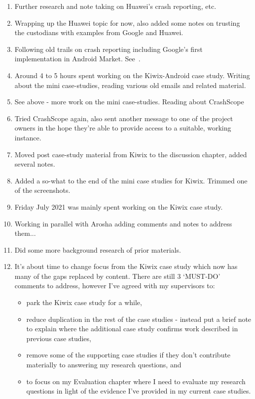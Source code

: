 \begin{enumerate}
    \item Further research and note taking on Huawei's crash reporting, etc.
    \item Wrapping up the Huawei topic for now, also added some notes on trusting the custodians with examples from Google and Huawei.
    \item Following old trails on crash reporting including Google's first implementation in Android Market. See~\href{app:crash-recording-and-reporting-in-android}{}.
    \item Around 4 to 5 hours spent working on the Kiwix-Android case study. Writing about the mini case-studies, reading various old emails and related material.
    \item See above - more work on the mini case-studies. Reading about CrashScope
    \item Tried CrashScope again, also sent another message to one of the project owners in the hope they're able to provide access to a suitable, working instance.
    \item Moved post case-study material from Kiwix to the discussion chapter, added several notes.
    \item Added a so-what to the end of the mini case studies for Kiwix. Trimmed one of the screenshots.
    \item Friday  July 2021 was mainly spent working on the Kiwix case study.
    \item Working in parallel with Arosha adding comments and notes to address them...
    \item Did some more background research of prior materials.
    \item It's about time to change focus from the Kiwix case study which now has many of the gaps replaced by content. There are still 3 `MUST-DO' comments to address, however I've agreed with my supervisors to:
    \begin{itemize}
        \item park the Kiwix case study for a while,
        \item reduce duplication in the rest of the case studies - instead put a brief note to explain where the additional case study confirms work described in previous case studies,
        \item remove some of the supporting case studies if they don't contribute materially to answering my research questions, and
        \item to focus on my Evaluation chapter where I need to evaluate my research questions in light of the evidence I've provided in my current case studies.

\end{itemize}
\end{enumerate}
